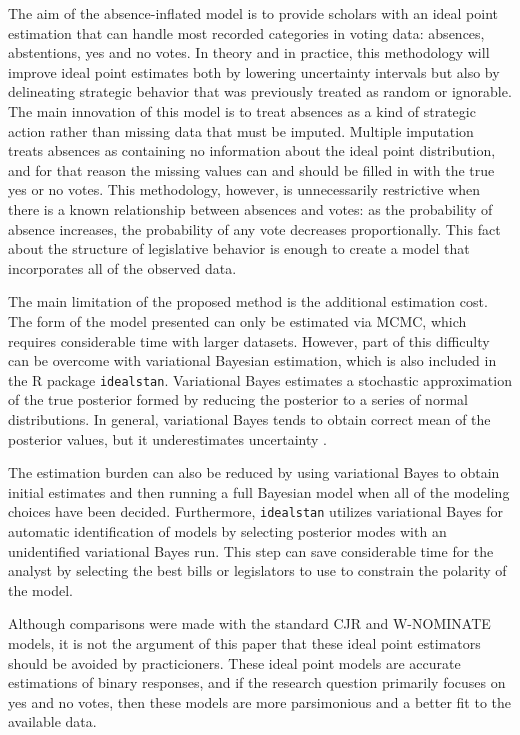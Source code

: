	The aim of the absence-inflated model is to provide scholars with an ideal point estimation that can handle most recorded categories in voting data: absences, abstentions, yes and no votes. In theory and in practice, this methodology will improve ideal point estimates both by lowering uncertainty intervals but also by delineating strategic behavior that was previously treated as random or ignorable. The main innovation of this model is to treat absences as a kind of strategic action rather than missing data that must be imputed. Multiple imputation treats absences as containing no information about the ideal point distribution, and for that reason the missing values can and should be filled in with the true yes or no votes. This methodology, however, is unnecessarily restrictive when there is a known relationship between absences and votes: as the probability of absence increases, the probability of any vote decreases proportionally. This fact about the structure of legislative behavior is enough to create a model that incorporates all of the observed data. 
	
	The main limitation of the proposed method is the additional estimation cost. The form of the model presented can only be estimated via MCMC, which requires considerable time with larger datasets. However, part of this difficulty can be overcome with variational Bayesian estimation, which is also included in the R package \texttt{idealstan}. Variational Bayes estimates a stochastic approximation of the true posterior formed by reducing the posterior to a series of normal distributions. In general, variational Bayes tends to obtain correct mean of the posterior values, but it underestimates uncertainty \parencite{NIPS2015_5758}.
	
	The estimation burden can also be reduced by using variational Bayes to obtain initial estimates and then running a full Bayesian model when all of the modeling choices have been decided. Furthermore, \texttt{idealstan} utilizes variational Bayes for automatic identification of models by selecting posterior modes with an unidentified variational Bayes run. This step can save considerable time for the analyst by selecting the best bills or legislators to use to constrain the polarity of the model. 
	
	Although comparisons were made with the standard CJR and W-NOMINATE models, it is not the argument of this paper that these ideal point estimators should be avoided by practicioners. These ideal point models are accurate estimations of binary responses, and if the research question primarily focuses on yes and no votes, then these models are more parsimonious and a better fit to the available data.
	

